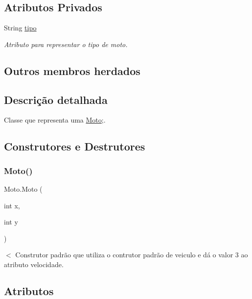 \subsection*{Atributos Privados}
\begin{DoxyCompactItemize}
\item 
String \mbox{\hyperlink{class_moto_a98533b801c6277bdac415e9d21f74efe}{tipo}}
\begin{DoxyCompactList}\small\item\em Atributo para representar o tipo de moto. \end{DoxyCompactList}\end{DoxyCompactItemize}
\subsection*{Outros membros herdados}


\subsection{Descrição detalhada}
Classe que representa uma \mbox{\hyperlink{class_moto}{Moto}};. 

\subsection{Construtores e Destrutores}
\mbox{\label{class_moto_a803d5eb919bb5e4c6f30e5455cf28097}} 
\subsubsection{\texorpdfstring{Moto()}{Moto()}}
{\footnotesize\ttfamily Moto.\+Moto (\begin{DoxyParamCaption}\item[{int}]{x,  }\item[{int}]{y }\end{DoxyParamCaption})}

$<$ Construtor padrão que utiliza o contrutor padrão de veiculo e dá o valor 3 ao atributo velocidade. 

\subsection{Atributos}
\mbox{\label{class_moto_a98533b801c6277bdac415e9d21f74efe}} 
